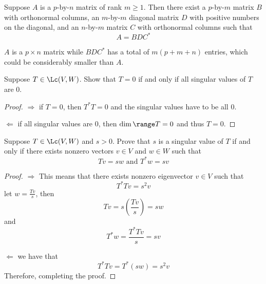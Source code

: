 \documentclass{extarticle}
\begin{document}
\begin{thm}
    Suppose \(A\) is a \(p\)-by-\(n\) matrix of rank \(m \geq 1\). Then there exist a \(p\)-by-\(m\) matrix
    \(B\) with orthonormal columns, an \(m\)-by-\(m\) diagonal matrix \(D\) with positive numbers on
    the diagonal, and an \(n\)-by-\(m\) matrix \(C\) with orthonormal columns such that
    \[A = BDC^*\]
\end{thm}

\begin{remark}
    \(A\) is a \(p \times n\) matrix while \(BDC^*\) has a total of \(m(p+m+n)\) entries, which
    could be considerably smaller than \(A\).
\end{remark}


\newpage
{}

\begin{problem}{1}
    Suppose \(T \in \Lc(V, W)\). Show that \(T = 0\) if and only if all singular
    values of \(T\) are 0.
\end{problem}

\begin{proof}
\(\Rightarrow\) if \(T = 0\), then \(T^*T = 0\) and the singular values have to be all 0.

\(\Leftarrow\) if all singular values are 0, then \(\dim \range T = 0\) and thus \(T = 0\).
\end{proof}

\begin{problem}{2}
    Suppose \(T \in \Lc(V, W)\) and \(s > 0\). Prove that \(s\) is a singular value of \(T\)
    if and only if there exists nonzero vectors \(v \in V\) and \(w \in W\) such that
    \[Tv = sw \text{ and } T^* w = sv\]
\end{problem}

\begin{proof}

\(\Rightarrow\) This means that there exists nonzero eigenvector \(v \in V\) such that
\[T^*T v = s^2 v\]
let \(w = \frac{Tv}{s}\), then
\[Tv = s\left(\frac{Tv}{s}\right) = sw\]
and
\[T^*w  = \frac{T^* Tv}{s} = sv\]

\(\Leftarrow\) we have that
\[T^*Tv = T^*(sw) = s^2v\]
Therefore, completing the proof.
\end{proof}
\end{document}
